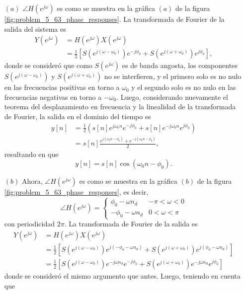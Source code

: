 \documentclass[a4paper]{report}
\begin{document}
\begin{enumerate}
 \item[\((a)\)] \(\angle H(e^{j\omega})\) es como se muestra en la gráfica \((a)\) de la figura \ref{fig:problem_5_63_phase_responses}. La transformada de Fourier de la salida del sistema es
 \begin{align*}
  Y(e^{j\omega})&=H(e^{j\omega})X(e^{j\omega})\\
   &=\frac{1}{2}\left[S(e^{j(\omega-\omega_0)})e^{-j\phi_0}+S(e^{j(\omega+\omega_0)})e^{j\phi_0}\right],
 \end{align*}
donde se consideró que como \(S(e^{j\omega})\) es de banda angosta, los componentes \(S(e^{j(\omega-\omega_0)})\) y \(S(e^{j(\omega+\omega_0)})\) no se interfieren, y el primero solo es no nulo en las frecuencias positivas en torno a \(\omega_0\) y el segundo solo es no nulo en las frecuencias negativas en torno a \(-\omega_0\). Luego, considerando nuevamente el teorema del desplazamiento en frecuencia y la linealidad de la transformada de Fourier, la salida en el dominio del tiempo es
\begin{align*}
 y[n]&=\frac{1}{2}\left(s[n]e^{j\omega_0n}e^{-j\phi_0}+s[n]e^{-j\omega_0n}e^{j\phi_0}\right)\\
  &=s[n]\frac{e^{j(\omega_0n-\phi_0)}+e^{-j(\omega_0n-\phi_0)}}{2},
\end{align*}
resultando en que 
\[
 y[n]=s[n]\cos(\omega_0n-\phi_0).
\]
 \item[\((b)\)] Ahora, \(\angle H(e^{j\omega})\) es como se muestra en la gráfica \((b)\) de la figura \ref{fig:problem_5_63_phase_responses}, es decir,
\[
 \angle H(e^{j\omega})=
 \left\{ 
 \begin{array}{ll}
  \phi_0-\omega n_d & -\pi<\omega<0\\
  -\phi_0-\omega n_d & 0<\omega<\pi
 \end{array}
 \right.
\]
con periodicidad \(2\pi\). La transformada de Fourier de la salida es
\begin{align}
  Y(e^{j\omega})&=H(e^{j\omega})X(e^{j\omega})\nonumber\\
   &=\frac{1}{2}\left[S(e^{j(\omega-\omega_0)})e^{j(-\phi_0-\omega n_d)}+S(e^{j(\omega+\omega_0)})e^{j(\phi_0-\omega n_d)}\right]\nonumber\\
    &=\frac{1}{2}\left[S(e^{j(\omega-\omega_0)})e^{-j\omega n_d}e^{-j\phi_0}+S(e^{j(\omega+\omega_0)})e^{-j\omega n_d}e^{j\phi_0}\right]\label{eq:transform_analysis_exercise_5_63_b_output_dtft}
\end{align}
donde se consideró el mismo argumento que antes. Luego, teniendo en cuenta que 

\end{enumerate}
\end{document}
